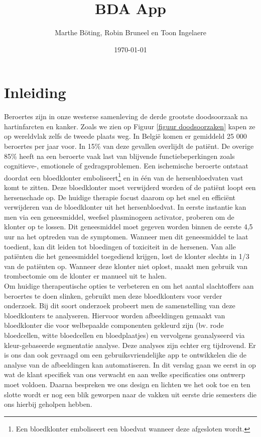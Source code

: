 \documentclass[a4paper,kulak]{kulakarticle}
\date{\today}
\title{BDA App}
\author{Marthe B\"{o}ting,	Robin Bruneel en Toon Ingelaere}
\begin{document}
	
	
	\maketitle

\section*{Inleiding}
Beroertes zijn in onze westerse samenleving de derde grootste doodsoorzaak na hartinfarcten en kanker. Zoals we zien op Figuur \ref{figuur doodsoorzaken} kapen ze op wereldvlak zelfs de tweede plaats weg\cite{worldhealthorganization}. In België komen er gemiddeld 25 000 beroertes per jaar voor. In 15\% van deze gevallen overlijdt de patiënt. De overige 85\% heeft na een beroerte vaak last van blijvende functiebeperkingen zoals cognitieve-, emotionele of gedragsproblemen. Een ischemische beroerte ontstaat doordat een bloedklonter emboliseert\footnote{Een bloedklonter emboliseert een bloedvat wanneer deze afgesloten wordt.} en in één van de hersenbloedvaten vast komt te zitten. Deze bloedklonter moet verwijderd worden of de patiënt loopt een hersenschade op.
De huidige therapie focust daarom op het snel en efficiënt verwijderen van de bloedklonter uit het hersenbloedvat. In eerste instantie kan men via een geneesmiddel, weefsel plasminogeen activator, proberen om de klonter op te lossen. Dit geneesmiddel moet gegeven worden binnen de eerste 4,5 uur na het optreden van de symptomen. Wanneer men dit geneesmiddel te laat toedient, kan dit leiden tot bloedingen of toxiciteit in de hersenen. Van alle patiënten die het geneesmiddel toegediend krijgen, lost de klonter slechts in 1/3 van de patiënten op. Wanneer deze klonter niet oplost, maakt men gebruik van trombectomie om de klonter er manueel uit te halen.\\
Om huidige therapeutische opties te verbeteren en om het aantal slachtoffers aan beroertes te doen slinken, gebruikt men deze bloedklonters voor verder onderzoek. Bij dit soort onderzoek probeert men de samenstelling van deze bloedklonters te analyseren. Hiervoor worden afbeeldingen gemaakt van bloedklonter die voor welbepaalde componenten gekleurd zijn (bv. rode bloedcellen, witte bloedcellen en bloedplaatjes) en vervolgens geanalyseerd via kleur-gebaseerde segmentatie analyse. 
Deze analyses zijn echter erg tijdrovend. Er is ons dan ook gevraagd om een gebruiksvriendelijke app te ontwikkelen die de analyse van de afbeeldingen kan automatiseren.
In dit verslag gaan we eerst in op wat de klant specifiek van ons verwacht en aan welke specificaties ons ontwerp moet voldoen. Daarna bespreken we ons design en lichten we het ook toe en ten slotte wordt er nog een blik geworpen naar de vakken uit eerste drie semesters die ons hierbij geholpen hebben.
\end{document}
